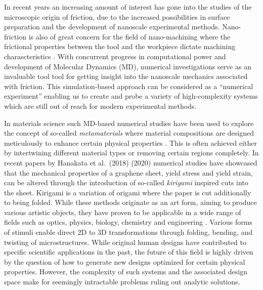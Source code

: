 In recent years an increasing amount of interest has gone into the studies
of the microscopic origin of friction, due to the increased possibilities in
surface preparation and the development of nanoscale experimental methods.
Nano-friction is also of great concern for the field of nano-machining where the
frictional properties between the tool and the workpiece dictate machining
charascteristics \cite{kim_nano-scale_2009}. With concurrent progress in
computational power and development of Molecular Dynamics (\acrshort{MD}),
numerical investigations serve as an invaluable tool tool for getting insight
into the nanoscale mechanics associated with friction. This simulation-based
approach can be considered as a ``numerical experiment'' enabling us to create
and probe a variety of high-complexity systems which are still out of reach for
modern experimental methods.

In materials science such \acrshort{MD}-based numerical studies have been used
to explore the concept of so-called \textit{metamaterials} where material
compositions are designed meticulously to enhance certain physical properties
\cite{PhysRevLett.121.255304, PhysRevResearch.2.042006, graphene/hBN, Mao, Yang, Forte}.
This is often achieved either by intertwining different material types or
removing certain regions completely. In recent papers by Hanakata et al.\
\cite{PhysRevLett.121.255304}(2018) \cite{PhysRevResearch.2.042006}(2020)
numerical studies have showcased that the mechanical properties of a graphene sheet,
yield stress and yield strain, can be altered through the
introduction of so-called \textit{kirigami} inspired cuts into the sheet.
Kirigami is a variation of origami where the paper is cut additionally to being
folded. While these methods originate as an art form, aiming to produce various
artistic objects, they have proven to be applicable in a wide range of fields
such as optics, physics, biology, chemistry and engineering
\cite{chen_kirigamiorigami_2020}. Various forms of stimuli enable direct 2D to
3D transformations through folding, bending, and twisting of microstructures.
While original human designs have contributed to specific scientific
applications in the past, the future of this field is highly driven by the
question of how to generate new designs optimized for certain physical
properties. However, the complexity of such systems and the associated design
space make for seemingly intractable problems ruling out analytic solutions.



